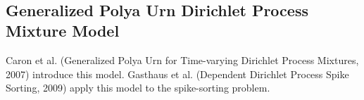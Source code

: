 \documentclass{article}
\begin{document}
\\




\subsection*{Generalized Polya Urn Dirichlet Process Mixture Model}
\vspace{6pt}
Caron et al. (Generalized Polya Urn for Time-varying Dirichlet Process Mixtures, 2007) introduce this model. Gasthaus et al. (Dependent Dirichlet Process Spike Sorting, 2009) apply this model to the spike-sorting problem.
\end{document}

